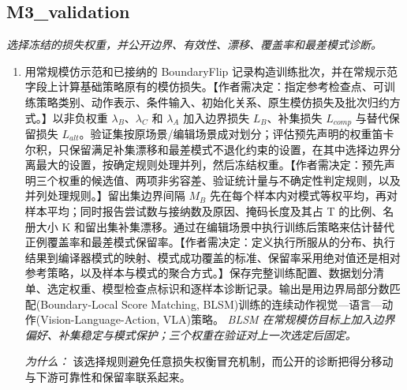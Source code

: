 \documentclass[10pt,a4paper]{article}
\begin{document}
\subsection*{M3\_validation}
\emph{选择冻结的损失权重，并公开边界、有效性、漂移、覆盖率和最差模式诊断。}
\begin{enumerate}[leftmargin=*,start=6]
  \item 用常规模仿示范和已接纳的 BoundaryFlip 记录构造训练批次，并在常规示范字段上计算基础策略原有的模仿损失。【作者需决定：指定参考检查点、可训练策略类别、动作表示、条件输入、初始化关系、原生模仿损失及批次归约方式。】以非负权重 \(\lambda _{B}\)、\(\lambda _{C}\) 和 \(\lambda _{A}\) 加入边界损失 \(L_{B}\)、补集损失 \(L_{comp}\) 与替代保留损失 \(L_{alt}\)。验证集按原场景/编辑场景成对划分；评估预先声明的权重笛卡尔积，只保留满足补集漂移和最差模式不退化约束的设置，在其中选择边界分离最大的设置，按确定规则处理并列，然后冻结权重。【作者需决定：预先声明三个权重的候选值、两项非劣容差、验证统计量与不确定性判定规则，以及并列处理规则。】留出集边界间隔 \(M_{B}\) 先在每个样本内对模式等权平均，再对样本平均；同时报告尝试数与接纳数及原因、掩码长度及其占 T 的比例、名册大小 K 和留出集补集漂移。通过在编辑场景中执行训练后策略来估计替代正例覆盖率和最差模式保留率。【作者需决定：定义执行所服从的分布、执行结果到编译器模式的映射、模式成功覆盖的标准、保留率采用绝对值还是相对参考策略，以及样本与模式的聚合方式。】保存完整训练配置、数据划分清单、选定权重、模型检查点标识和逐样本诊断记录。输出是用边界局部分数匹配(Boundary-Local Score Matching, BLSM)训练的连续动作视觉---语言---动作(Vision-Language-Action, VLA)策略。
\noindent\emph{BLSM 在常规模仿目标上加入边界偏好、补集稳定与模式保护；三个权重在验证对上一次选定后固定。}
\par{}
\par\emph{为什么：} 该选择规则避免任意损失权衡冒充机制，而公开的诊断把得分移动与下游可靠性和保留率联系起来。
\end{enumerate}
\end{document}
